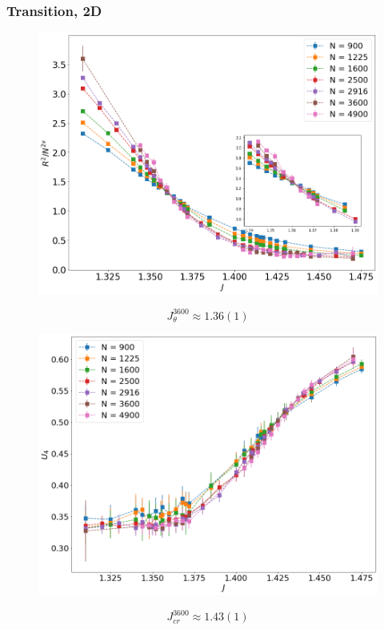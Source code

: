 \documentclass{beamer}
\begin{document}
\begin{frame}
	\frametitle{Transition, 2D}
	\begin{multicols}{2}	
		\begin{figure}[h]
	\centering
	\includegraphics[scale=0.1822]{rscaling_longchains.png} 
	\label{ph}
\end{figure}
\begin{equation*}
\label{eq:critical_J_theta_2D}
J_{\theta}^{3600} \approx  1.36(1) 
\end{equation*}		
		\columnbreak		
		\begin{figure}[h]
		\centering
		\includegraphics[scale=0.1822 ]{bindercumulants_longchains.png} 
		\label{ph}
		\end{figure}
		\begin{equation*}
		\label{eq:critical_J_magnet_2D}
		J_{cr}^{3600} \approx  1.43(1)
		\end{equation*}
	\end{multicols}
\end{frame}
\end{document}
